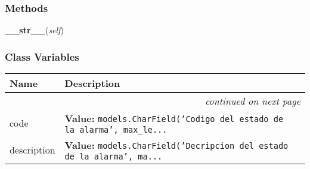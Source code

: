   \subsubsection{Methods}

    \label{GroundSegment:models:Alarm:AlarmState:AlarmState:__str__}

    \vspace{0.5ex}

\hspace{.8\funcindent}\begin{boxedminipage}{\funcwidth}

    \raggedright \textbf{\_\_str\_\_}(\textit{self})

\setlength{\parskip}{2ex}
\setlength{\parskip}{1ex}
    \end{boxedminipage}



  \subsubsection{Class Variables}

    \vspace{-1cm}
\hspace{\varindent}\begin{longtable}{|p{\varnamewidth}|p{\vardescrwidth}|l}
\cline{1-2}
\cline{1-2} \centering \textbf{Name} & \centering \textbf{Description}& \\
\cline{1-2}
\endhead\cline{1-2}\multicolumn{3}{r}{\small\textit{continued on next page}}\\\endfoot\cline{1-2}
\endlastfoot\raggedright c\-o\-d\-e\- & \raggedright \textbf{Value:} 
{\tt models.CharField('Codigo del estado de la alarma', max\_le\texttt{...}}&\\
\cline{1-2}
\raggedright d\-e\-s\-c\-r\-i\-p\-t\-i\-o\-n\- & \raggedright \textbf{Value:} 
{\tt models.CharField('Decripcion del estado de la alarma', ma\texttt{...}}&\\
\cline{1-2}
\end{longtable}

